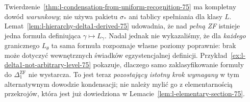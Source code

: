 \begin{uwaga}
\label{rem:l-recognition-gap-75}
Twierdzenie~\ref{thm:l-condensation-from-uniform-recognition-75}
ma kompletny dowód \emph{warunkowy}; nie używa
pakietu $\sigma_*$ ani tablicy spełniania dla
klasy $L$. Lemat~\ref{lem:l-hierarchy-delta1-derived-75}
udowadnia, że nad \emph{pełną ZF} istnieje jedna
formuła definiująca $\gamma\mapsto L_\gamma$.
Nadal jednak nie wykazaliśmy, że dla \emph{każdego}
granicznego $L_\theta$ ta sama formuła rozpoznaje
własne poziomy poprawnie: brak może dotyczyć
wewnętrznych świadków egzystencjalnej definicji.
Przykład~\ref{ex:l-delta1-not-arbitrary-level-75}
pokazuje, dlaczego samo zaklasyfikowanie formuły
do $\Delta_1^{\mathrm{ZF}}$ nie wystarcza.
To jest teraz \emph{pozostający istotny krok wymagany}
w tym alternatywnym dowodzie kondensacji; nie należy
mylić go z elementarnością przekrojów, która jest
już dowiedziona w Lemacie~\ref{lem:l-elementary-section-75}.
\end{uwaga}

